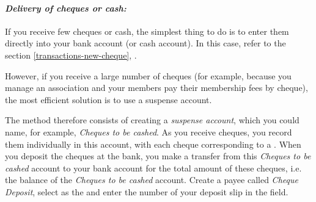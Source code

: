 \paragraph{\textsl{Delivery of cheques or cash:}\label{accounts-type-bank-waiting-remittance}}

If you receive few cheques or cash, the simplest thing to do is to enter them directly into your bank account (or cash account). In this case, refer to the section \vref{transactions-new-cheque}, .

However, if you receive a large number of cheques (for example, because you manage an association and your members pay their membership fees by cheque), the most efficient solution is to use a suspense account.

The method therefore consists of creating a \emph{suspense account}, which you could name, for example, \emph{Cheques to be cashed}. As you receive cheques, you record them individually in this account, with each cheque corresponding to a . When you deposit the cheques at the bank, you make a transfer from this \emph{Cheques to be cashed} account to your bank account for the total amount of these cheques, i.e. the balance of the \emph{Cheques to be cashed} account. Create a payee called \emph{Cheque Deposit}, select  as the  and enter the number of your deposit slip in the  field.

